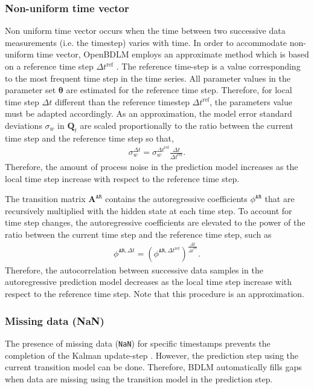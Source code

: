 \subsubsection{Non-uniform time vector}
\label{SS:NonUniform}

Non uniform time vector occurs when the time between two successive data measurements (i.e. the timestep) varies with time.
In order to accommodate non-uniform time vector, OpenBDLM employs an approximate method which is based on a reference time step $\Delta t^{\text{ref}} $ \cite{STC:STC2035}. 
The reference time-step is a value corresponding to the most frequent time step in the time series.
All parameter values in the parameter set $\bm \theta$ are estimated for the reference time step. 
Therefore, for local time step $\Delta t$ different than the reference timestep $\Delta t^{\text{ref}} $, the parameters value must be adapted accordingly.
As an approximation, the model error standard deviations  $\sigma_{w}$ in $\mathbf{Q}_{t}$ are scaled proportionally to the ratio between the current time step and the reference time step so that,
\begin{gather*}
\sigma_{w}^{\Delta t}= \sigma_{w}^{\Delta t ^{\text{ref}}}\frac{\Delta t}{\Delta t ^{\text{ref}}}.
\end{gather*}
Therefore, the amount of process noise in the prediction model increases as the local time step increase with respect to the reference time step.

The transition matrix $\mathbf{A}^{\mathtt{AR}}$ contains the autoregressive coefficients $\phi^{\mathtt{AR}}$ that are recursively multiplied with the hidden state at each time step. 
To account for time step changes, the autoregressive coefficients are elevated to the power of the ratio between the current time step and the reference time step, such as
\begin{gather*}
\phi^{\mathtt{AR}, \Delta t}=  (\phi^{\mathtt{AR}, \Delta t ^{\text{ref}}})^{\frac{\Delta t}{\Delta t ^{\text{ref}}}}.
\end{gather*}
Therefore, the autocorrelation between successive data samples in the autoregressive prediction model decreases as the local time step increase with respect to the reference time step.
Note that this procedure is an approximation.
\subsubsection{Missing data (NaN)}

The presence of missing data (\lstinline[basicstyle = \mlttfamily \small ]!NaN!) for specific timestamps prevents the completion of the Kalman update-step \cite{STC:STC2035}.
However, the prediction step using the current transition model can be done.
Therefore, BDLM automatically fills gaps when data are missing using the transition model in the prediction step.


